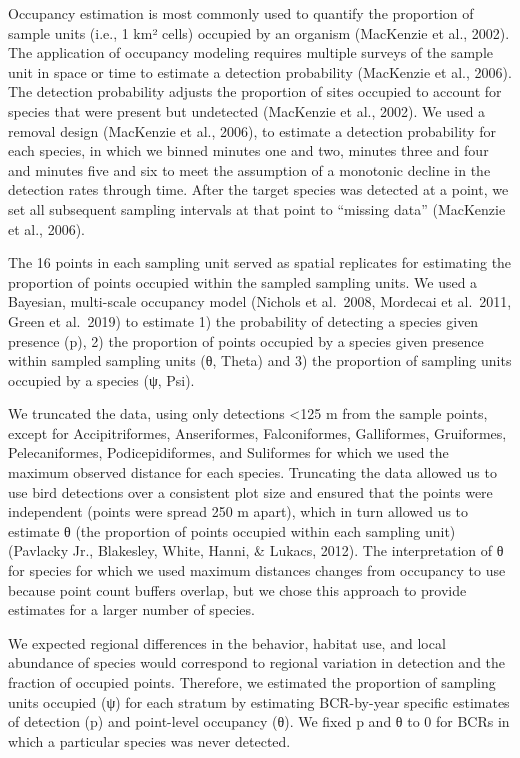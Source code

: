 \documentclass[
  letterpaper,
  DIV=11,
  numbers=noendperiod,
  oneside]{scrreprt}
\begin{document}
Occupancy estimation is most commonly used to quantify the proportion of
sample units (i.e., 1 km² cells) occupied by an organism (MacKenzie et
al., 2002). The application of occupancy modeling requires multiple
surveys of the sample unit in space or time to estimate a detection
probability (MacKenzie et al., 2006). The detection probability adjusts
the proportion of sites occupied to account for species that were
present but undetected (MacKenzie et al., 2002). We used a removal
design (MacKenzie et al., 2006), to estimate a detection probability for
each species, in which we binned minutes one and two, minutes three and
four and minutes five and six to meet the assumption of a monotonic
decline in the detection rates through time. After the target species
was detected at a point, we set all subsequent sampling intervals at
that point to ``missing data'' (MacKenzie et al., 2006).

The 16 points in each sampling unit served as spatial replicates for
estimating the proportion of points occupied within the sampled sampling
units. We used a Bayesian, multi-scale occupancy model (Nichols et
al.~2008, Mordecai et al.~2011, Green et al.~2019) to estimate 1) the
probability of detecting a species given presence (p), 2) the proportion
of points occupied by a species given presence within sampled sampling
units (θ, Theta) and 3) the proportion of sampling units occupied by a
species (ψ, Psi).

We truncated the data, using only detections \textless125 m from the
sample points, except for Accipitriformes, Anseriformes, Falconiformes,
Galliformes, Gruiformes, Pelecaniformes, Podicepidiformes, and
Suliformes for which we used the maximum observed distance for each
species. Truncating the data allowed us to use bird detections over a
consistent plot size and ensured that the points were independent
(points were spread 250 m apart), which in turn allowed us to estimate θ
(the proportion of points occupied within each sampling unit) (Pavlacky
Jr., Blakesley, White, Hanni, \& Lukacs, 2012). The interpretation of θ
for species for which we used maximum distances changes from occupancy
to use because point count buffers overlap, but we chose this approach
to provide estimates for a larger number of species.

We expected regional differences in the behavior, habitat use, and local
abundance of species would correspond to regional variation in detection
and the fraction of occupied points. Therefore, we estimated the
proportion of sampling units occupied (ψ) for each stratum by estimating
BCR-by-year specific estimates of detection (p) and point-level
occupancy (θ). We fixed p and θ to 0 for BCRs in which a particular
species was never detected.
\end{document}
